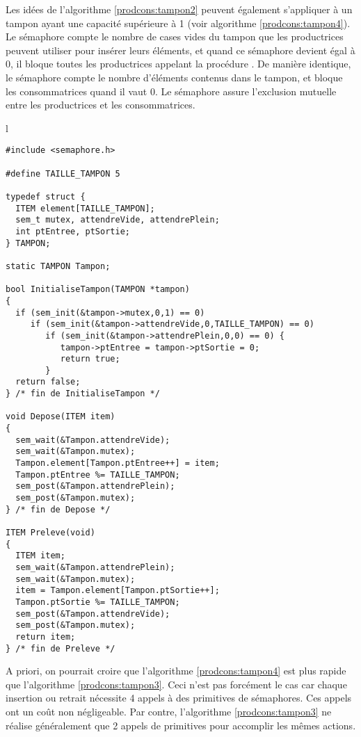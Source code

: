 Les idées de l'algorithme \ref{prodcons:tampon2} peuvent également s'appliquer à un tampon ayant une capacité supérieure à 1 (voir algorithme \ref{prodcons:tampon4}).
Le sémaphore  compte le nombre de cases vides du tampon que les productrices peuvent utiliser pour insérer leurs éléments, et quand ce sémaphore devient égal à 0, il bloque toutes les productrices appelant la procédure .
De manière identique, le sémaphore  compte le nombre d'éléments contenus dans le tampon, et bloque les consommatrices quand il vaut 0. Le sémaphore  assure l'exclusion mutuelle entre les productrices et les consommatrices.

\begin{algorithm}[!ht]
\caption{Extension de l'algorithme \ref{prodcons:tampon2}}\label{prodcons:tampon4}
\centering
\begin{tabular}{l}
\lstset{language=C++}
\begin{lstlisting}
#include <semaphore.h>

#define TAILLE_TAMPON 5

typedef struct {
  ITEM element[TAILLE_TAMPON];
  sem_t mutex, attendreVide, attendrePlein;
  int ptEntree, ptSortie;
} TAMPON;

static TAMPON Tampon;

bool InitialiseTampon(TAMPON *tampon)
{
  if (sem_init(&tampon->mutex,0,1) == 0)
     if (sem_init(&tampon->attendreVide,0,TAILLE_TAMPON) == 0)
        if (sem_init(&tampon->attendrePlein,0,0) == 0) {
           tampon->ptEntree = tampon->ptSortie = 0;
           return true;
        }
  return false;
} /* fin de InitialiseTampon */

void Depose(ITEM item)
{
  sem_wait(&Tampon.attendreVide);
  sem_wait(&Tampon.mutex);
  Tampon.element[Tampon.ptEntree++] = item;
  Tampon.ptEntree %= TAILLE_TAMPON;
  sem_post(&Tampon.attendrePlein);
  sem_post(&Tampon.mutex);
} /* fin de Depose */

ITEM Preleve(void)
{
  ITEM item;
  sem_wait(&Tampon.attendrePlein);
  sem_wait(&Tampon.mutex);
  item = Tampon.element[Tampon.ptSortie++];
  Tampon.ptSortie %= TAILLE_TAMPON;
  sem_post(&Tampon.attendreVide);
  sem_post(&Tampon.mutex);
  return item;
} /* fin de Preleve */
\end{lstlisting}
\end{tabular}

\end{algorithm}

A priori, on pourrait croire que l'algorithme \ref{prodcons:tampon4} est plus rapide que l'algorithme \ref{prodcons:tampon3}. Ceci n'est pas forcément le cas car chaque insertion ou retrait nécessite 4 appels à des primitives de sémaphores. Ces appels ont un coût non négligeable. Par contre, l'algorithme \ref{prodcons:tampon3} ne réalise généralement que 2 appels de primitives pour accomplir les mêmes actions.

